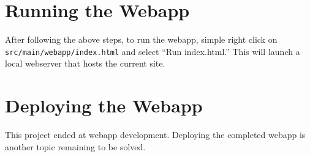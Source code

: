 \section{Running the Webapp}\label{sec:running-the-webapp}
After following the above steps, to run the webapp, simple right click on \\\texttt{src/main/webapp/index.html} and select ``Run index.html.''
This will launch a local webserver that hosts the current site.

\section{Deploying the Webapp}\label{sec:deploying-the-webapp}
This project ended at webapp development.
Deploying the completed webapp is another topic remaining to be solved.